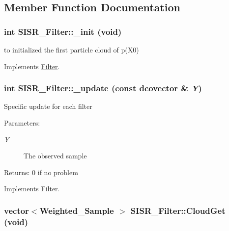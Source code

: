 \subsection{Member Function Documentation}
\hypertarget{class_s_i_s_r___filter_307c7a9012848bb6d441020443191725}{
\subsubsection[{\_\-init}]{\setlength{\rightskip}{0pt plus 5cm}int SISR\_\-Filter::\_\-init (void)}}
\label{class_s_i_s_r___filter_307c7a9012848bb6d441020443191725}


to initialized the first particle cloud of p(X0) 



Implements \hyperlink{class_filter_f46a456184971270ca36733d937f14fb}{Filter}.\hypertarget{class_s_i_s_r___filter_e6aac1c96b9c6803425fd712cbf730d1}{
\subsubsection[{\_\-update}]{\setlength{\rightskip}{0pt plus 5cm}int SISR\_\-Filter::\_\-update (const dcovector \& {\em Y})}}
\label{class_s_i_s_r___filter_e6aac1c96b9c6803425fd712cbf730d1}


Specific update for each filter

\begin{Desc}
\item[Parameters:]
\begin{description}
\item[{\em Y}]The observed sample\end{description}
\end{Desc}
\begin{Desc}
\item[Returns:]0 if no problem \end{Desc}


Implements \hyperlink{class_filter_20ecd17fed3b8f11a76c960fe5e7144b}{Filter}.\hypertarget{class_s_i_s_r___filter_9ee7212b795b51f2c13e06d84bebe9cb}{
\subsubsection[{CloudGet}]{\setlength{\rightskip}{0pt plus 5cm}vector$<${\bf Weighted\_\-Sample} $>$ SISR\_\-Filter::CloudGet (void)}}
\label{class_s_i_s_r___filter_9ee7212b795b51f2c13e06d84bebe9cb}


